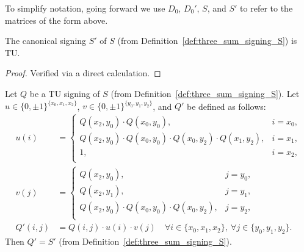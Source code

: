 \begin{definition}
\begin{center}
    \end{center}
    To simplify notation, going forward we use $D_{0}$, $D_{0}'$, $S$, and $S'$ to refer to the matrices of the form above.
\end{definition}

\begin{lemma}\label{lem:three_sum_signing_S_TU}
    The canonical signing $S'$ of $S$ (from Definition~\ref{def:three_sum_signing_S}) is TU.
\end{lemma}

\begin{proof}
    Verified via a direct calculation.
\end{proof}

\begin{lemma}\label{lem:three_sum_re_signing_helper}
    Let $Q$ be a TU signing of $S$ (from Definition~\ref{def:three_sum_signing_S}). Let $u \in \{0, \pm 1\}^{\{x_{0}, x_{1}, x_{2}\}}$, $v \in \{0, \pm 1\}^{\{y_{0}, y_{1}, y_{2}\}}$, and $Q'$ be defined as follows:
    \begin{align*}
        u(i) &= \begin{cases}
            Q (x_{2}, y_{0}) \cdot Q (x_{0}, y_{0}), & i = x_{0}, \\
            Q (x_{2}, y_{0}) \cdot Q (x_{0}, y_{0}) \cdot Q (x_{0}, y_{2}) \cdot Q (x_{1}, y_{2}), & i = x_{1}, \\
            1, & i = x_{2}, \\
        \end{cases} \\
        v(j) &= \begin{cases}
            Q (x_{2}, y_{0}), & j = y_{0}, \\
            Q (x_{2}, y_{1}), & j = y_{1}, \\
            Q (x_{2}, y_{0}) \cdot Q (x_{0}, y_{0}) \cdot Q (x_{0}, y_{2}), & j = y_{2}, \\
        \end{cases} \\
        Q' (i, j) &= Q (i, j) \cdot u(i) \cdot v(j) \quad \forall i \in \{x_{0}, x_{1}, x_{2}\}, \ \forall j \in \{y_{0}, y_{1}, y_{2}\}.
    \end{align*}
    Then $Q' = S'$ (from Definition~\ref{def:three_sum_signing_S}).
\end{lemma}

